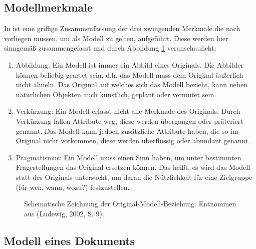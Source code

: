  
\subsection{Modellmerkmale}\label{modellmerkmale}
 
In \citep[S.~9]{Ludewig} ist eine griffige Zusammenfassung der drei zwingenden Merkmale die nach \citep{Stachowiak} vorliegen müssen, um als Modell zu gelten, aufgeführt. Diese werden hier sinngemäß zusammengefasst und durch Abbildung \ref{modell} veranschaulicht:

 
\begin{enumerate}

\item Abbildung: Ein Modell ist immer ein Abbild eines Originals. Die Abbilder können beliebig geartet sein, d.h. das Modell muss dem Original äußerlich nicht ähneln. Das Original auf welches sich das Modell bezieht, kann neben natürlichen Objekten auch künstlich, geplant oder vermutet sein.
\item Verkürzung: Ein Modell erfasst nicht alle Merkmale des Originals. Durch Verkürzung fallen Attribute weg, diese werden übergangen oder präteriert genannt. Das Modell kann jedoch zusätzliche Attribute haben, die so im Original nicht vorkommen, diese werden überflüssig oder abundant genannt.
\item Pragmatismus: Ein Modell muss einen Sinn haben, um unter bestimmten Fragestellungen das Original ersetzen können. Das heißt, es wird das Modell statt des Originals untersucht, um daran die Nützlichkeit für eine Zielgruppe (für wen, wann, wozu?) festzustellen.
\end{enumerate}
 
\begin{figure}[h!]
\centering
\advance\leftskip-2.5cm
\caption{ Schematische Zeichnung der Original-Modell-Beziehung. Entnommen aus (Ludewig, 2002, S. 9). }\label{modell}
\end{figure}
 
\subsection{Modell eines Dokuments}\label{dokumentModell}
 
